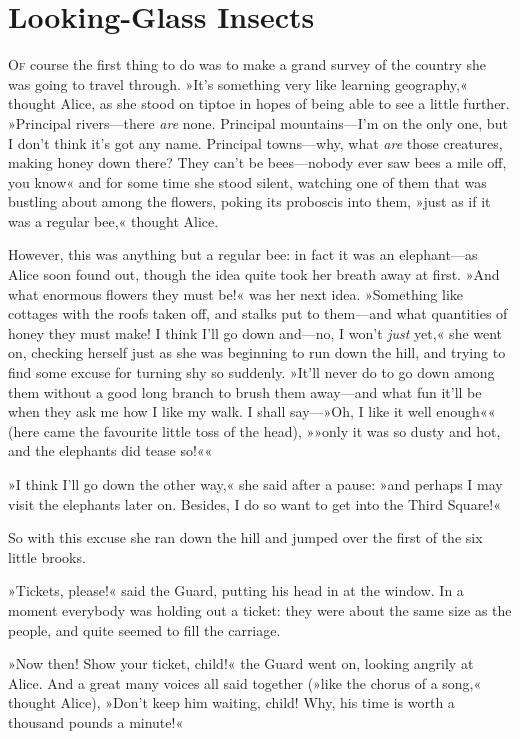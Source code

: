 \chapter{Looking-Glass Insects}

\lettrine[lines=4]{O}{f} course the first thing to do was to make a grand survey of the country she was going to travel through. »It's something very like learning geography,« thought Alice, as she stood on tiptoe in hopes of being able to see a little further. »Principal rivers—there \textit{are} none. Principal mountains—I'm on the only one, but I don't think it's got any name. Principal towns—why, what \textit{are} those creatures, making honey down there? They can't be bees—nobody ever saw bees a mile off, you know\longdash« and for some time she stood silent, watching one of them that was bustling about among the flowers, poking its proboscis into them, »just as if it was a regular bee,« thought Alice.

However, this was anything but a regular bee: in fact it was an elephant—as Alice soon found out, though the idea quite took her breath away at first. »And what enormous flowers they must be!« was her next idea. »Something like cottages with the roofs taken off, and stalks put to them—and what quantities of honey they must make! I think I'll go down and—no, I won't \textit{just} yet,« she went on, checking herself just as she was beginning to run down the hill, and trying to find some excuse for turning shy so suddenly. »It'll never do to go down among them without a good long branch to brush them away—and what fun it'll be when they ask me how I like my walk. I shall say—»Oh, I like it well enough\longdash«« (here came the favourite little toss of the head), »»only it was so dusty and hot, and the elephants did tease so!««

»I think I'll go down the other way,« she said after a pause: »and perhaps I may visit the elephants later on. Besides, I do so want to get into the Third Square!«

So with this excuse she ran down the hill and jumped over the first of the six little brooks.

\label{white2} »Tickets, please!« said the Guard, putting his head in at the window. In a moment everybody was holding out a ticket: they were about the same size as the people, and quite seemed to fill the carriage.

»Now then! Show your ticket, child!« the Guard went on, looking angrily at Alice. And a great many voices all said together (»like the chorus of a song,« thought Alice), »Don't keep him waiting, child! Why, his time is worth a thousand pounds a minute!«

